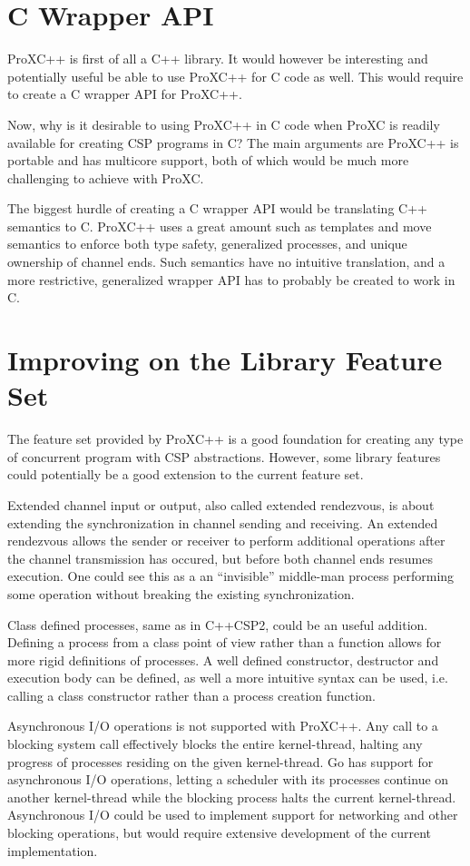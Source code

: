 \section{C Wrapper API}

ProXC++ is first of all a C++ library. It would however be interesting and potentially useful be able to use ProXC++ for C code as well. This would require to create a C wrapper API for ProXC++.

Now, why is it desirable to using ProXC++ in C code when ProXC is readily available for creating CSP programs in C? The main arguments are ProXC++ is portable and has multicore support, both of which would be much more challenging to achieve with ProXC. 

The biggest hurdle of creating a C wrapper API would be translating C++ semantics to C. ProXC++ uses a great amount such as templates and move semantics to enforce both type safety, generalized processes, and unique ownership of channel ends. Such semantics have no intuitive translation, and a more restrictive, generalized wrapper API has to probably be created to work in C.


\section{Improving on the Library Feature Set}

The feature set provided by ProXC++ is a good foundation for creating any type of concurrent program with CSP abstractions. However, some library features could potentially be a good extension to the current feature set.

Extended channel input or output, also called extended rendezvous, is about extending the synchronization in channel sending and receiving. An extended rendezvous allows the sender or receiver to perform additional operations after the channel transmission has occured, but before both channel ends resumes execution. One could see this as a an ``invisible'' middle\hyp{}man process performing some operation without breaking the existing synchronization.

Class defined processes, same as in C++CSP2, could be an useful addition. Defining a process from a class point of view rather than a function allows for more rigid definitions of processes. A well defined constructor, destructor and execution body can be defined, as well a more intuitive syntax can be used, i.e. calling a class constructor rather than a process creation function.

Asynchronous I/O operations is not supported with ProXC++. Any call to a blocking system call effectively blocks the entire kernel\hyp{}thread, halting any progress of processes residing on the given kernel\hyp{}thread. Go has support for asynchronous I/O operations, letting a scheduler with its processes continue on another kernel\hyp{}thread while the blocking process halts the current kernel\hyp{}thread. Asynchronous I/O could be used to implement support for networking and other blocking operations, but would require extensive development of the current implementation.

